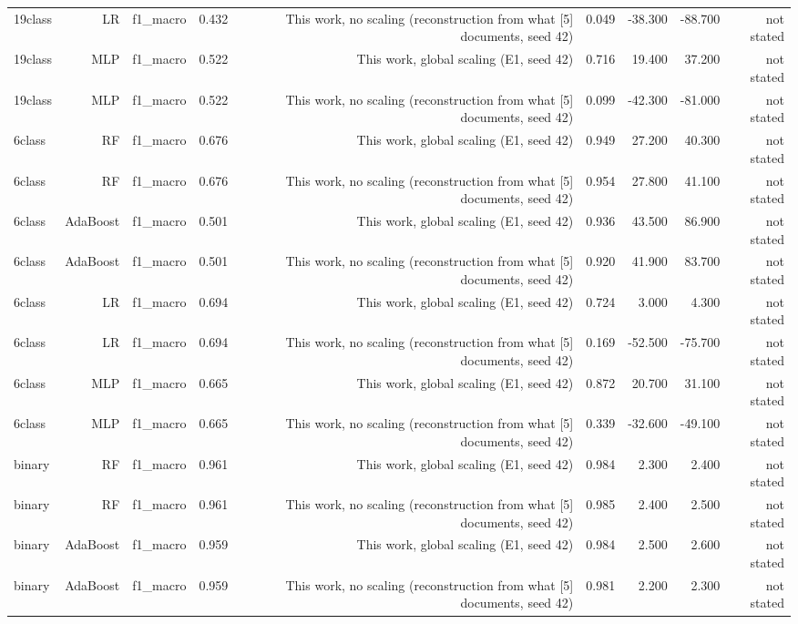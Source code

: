 \begin{table}[htbp]
{\begin{tabular}{lrrrrrrrr}
19class & LR & f1\_macro & 0.432 & This work, no scaling (reconstruction from what [5] documents, seed 42) & 0.049 & -38.300 & -88.700 & not stated \\
19class & MLP & f1\_macro & 0.522 & This work, global scaling (E1, seed 42) & 0.716 & 19.400 & 37.200 & not stated \\
19class & MLP & f1\_macro & 0.522 & This work, no scaling (reconstruction from what [5] documents, seed 42) & 0.099 & -42.300 & -81.000 & not stated \\
6class & RF & f1\_macro & 0.676 & This work, global scaling (E1, seed 42) & 0.949 & 27.200 & 40.300 & not stated \\
6class & RF & f1\_macro & 0.676 & This work, no scaling (reconstruction from what [5] documents, seed 42) & 0.954 & 27.800 & 41.100 & not stated \\
6class & AdaBoost & f1\_macro & 0.501 & This work, global scaling (E1, seed 42) & 0.936 & 43.500 & 86.900 & not stated \\
6class & AdaBoost & f1\_macro & 0.501 & This work, no scaling (reconstruction from what [5] documents, seed 42) & 0.920 & 41.900 & 83.700 & not stated \\
6class & LR & f1\_macro & 0.694 & This work, global scaling (E1, seed 42) & 0.724 & 3.000 & 4.300 & not stated \\
6class & LR & f1\_macro & 0.694 & This work, no scaling (reconstruction from what [5] documents, seed 42) & 0.169 & -52.500 & -75.700 & not stated \\
6class & MLP & f1\_macro & 0.665 & This work, global scaling (E1, seed 42) & 0.872 & 20.700 & 31.100 & not stated \\
6class & MLP & f1\_macro & 0.665 & This work, no scaling (reconstruction from what [5] documents, seed 42) & 0.339 & -32.600 & -49.100 & not stated \\
binary & RF & f1\_macro & 0.961 & This work, global scaling (E1, seed 42) & 0.984 & 2.300 & 2.400 & not stated \\
binary & RF & f1\_macro & 0.961 & This work, no scaling (reconstruction from what [5] documents, seed 42) & 0.985 & 2.400 & 2.500 & not stated \\
binary & AdaBoost & f1\_macro & 0.959 & This work, global scaling (E1, seed 42) & 0.984 & 2.500 & 2.600 & not stated \\
binary & AdaBoost & f1\_macro & 0.959 & This work, no scaling (reconstruction from what [5] documents, seed 42) & 0.981 & 2.200 & 2.300 & not stated \\

\end{tabular}}
\end{table}
